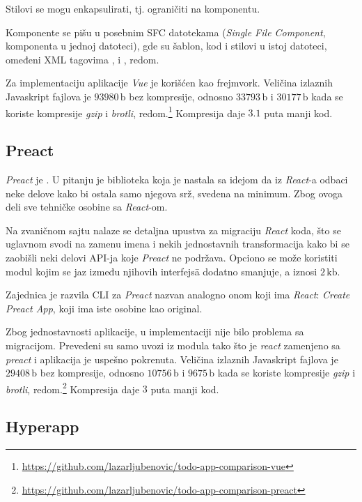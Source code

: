 Stilovi se mogu enkapsulirati, tj. ograničiti na komponentu.

Komponente se pišu u posebnim SFC datotekama (\textsl{Single File Component}, komponenta u jednoj datoteci), gde su šablon, kod i stilovi u istoj datoteci, omeđeni XML tagovima ,  i , redom.

Za implementaciju  aplikacije \textsl{Vue} je korišćen kao frejmvork.
Veličina izlaznih Javaskript fajlova je $93980\,\mathrm{b}$ bez kompresije, odnosno $33793\,\mathrm{b}$ i $30177\,\mathrm{b}$ kada se koriste kompresije \textsl{gzip} i \textsl{brotli}, redom.\footnote{\url{https://github.com/lazarljubenovic/todo-app-comparison-vue}} Kompresija daje $3.1$ puta manji kod.

\subsection{Preact}

\textsl{Preact} je .
U pitanju je biblioteka koja je nastala sa idejom da iz \textsl{React}-a odbaci neke delove kako bi ostala samo njegova srž, svedena na minimum.
Zbog ovoga deli sve tehničke osobine sa \textsl{React}-om.

Na zvaničnom sajtu nalaze se detaljna upustva za migraciju \textsl{React} koda, što se uglavnom svodi na zamenu imena i nekih jednostavnih transformacija kako bi se zaobišli neki delovi API-ja koje \textsl{Preact} ne podržava.
Opciono se može koristiti modul  kojim se jaz između njihovih interfejs\=a dodatno smanjuje, a iznosi $2\,\mathrm{kb}$.

Zajednica je razvila CLI za \textsl{Preact} nazvan analogno onom koji ima \textsl{React}: \textsl{Create Preact App}, koji ima iste osobine kao original.

Zbog jednostavnosti  aplikacije, u implementaciji nije bilo problema sa migracijom.
Prevedeni su samo uvozi iz modula tako što je \textsl{react} zamenjeno sa \textsl{preact} i aplikacija je uspešno pokrenuta.
Veličina izlaznih Javaskript fajlova je $29408\,\mathrm{b}$ bez kompresije, odnosno $10756\,\mathrm{b}$ i $9675\,\mathrm{b}$ kada se koriste kompresije \textsl{gzip} i \textsl{brotli}, redom.\footnote{\url{https://github.com/lazarljubenovic/todo-app-comparison-preact}} Kompresija daje $3$ puta manji kod.

\subsection{Hyperapp}

